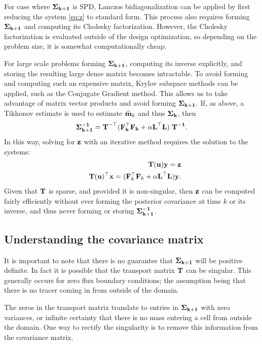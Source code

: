 \documentclass[12pt]{article}
\newcommand {\bfx}  { {\bf x} }
\newcommand {\bfu}   { {\bf u} }
\newcommand {\bfz}   { {\bf z} }
\newcommand {\bfy}   { {\bf y} }
\newcommand {\bfF}  { {\bf F} }
\newcommand{\bT}  {\text{\bf T}} %
\newcommand{\bfL}  {\text{{\bf L}}} %
\newcommand{\mhat}{\widehat{\bf m}}
\newcommand{\Sigh}{\bf \Sigma}
\begin{document}
For case where $\Sigh_{k+1}$ is SPD, Lanczos bidiagonalization can be applied by first reducing the system \eqref{eq:z} to standard form. This process also requires  forming $\Sigh_{k+1}$ and computing its Cholesky factorization. However, the Cholesky factorization is evaluated outside of the design optimization, so depending on the problem size, it is somewhat computationally cheap. 

For large scale problems forming $\Sigh_{k+1}$, computing its inverse explicitly, and storing the resulting large dense matrix becomes intractable. To avoid forming and computing such an expensive matrix, Krylov subspace methods can be applied, such as the Conjugate Gradient method. This allows us to take advantage of matrix vector products and avoid forming $\Sigh_{k+1}$. If, as above, a Tikhonov estimate is used to estimate $\mhat_k$ and thus $\Sigh_k$, then 
\begin{equation}
\Sigh_{k+1}^{-1} = {\bT}^{-\top}(\bfF_k^{\top} \bfF_k +\alpha \bfL^{\top} \bfL)\;{\bT}^{-1}.
\end{equation}
In this way, solving for $\bfz$ with an iterative method requires the solution to the systems:
\begin{eqnarray}
&&\bT(\bfu) \bfy = \bfz\\
&&\bT(\bfu)^{\top} \bfx = (\bfF_k^{\top} \bfF_k +\alpha \bfL^{\top} \bfL)\bfy.
\end{eqnarray}
Given that $\bT$ is sparse, and provided it is non-singular, then $\bfz$ can be computed fairly efficiently without ever forming the posterior covariance at time $k$ or its inverse, and thus never forming or storing $\Sigh_{k+1}^{-1}$. 




\subsection{Understanding the covariance matrix}
It is important to note  that there is no guarantee that $\Sigh_{k+1}$ will be positive definite. In fact it is possible that the transport matrix $\bT$ can  be singular. This generally occurs for zero flux boundary conditions; the assumption being that there is no tracer coming in from outside of the domain.  

The zeros in the transport matrix translate to entries in $\Sigh_{k+1}$ with zero variances, or infinite certainty that there is no mass entering a cell from outside the domain. 
One way to rectify the singularity is to remove this information from the covariance matrix. 
\end{document}
